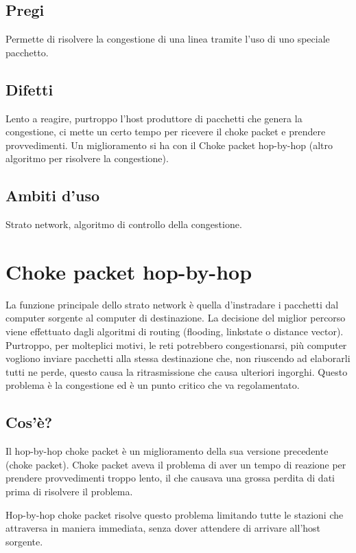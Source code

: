 \subsection{Pregi}
Permette di risolvere la congestione di una linea tramite l'uso di uno speciale pacchetto.

\subsection{Difetti}
Lento a reagire, purtroppo l'host produttore di pacchetti che genera la congestione, ci mette un certo tempo per ricevere il choke packet e prendere provvedimenti. Un miglioramento si ha con il Choke packet hop-by-hop (altro algoritmo per risolvere la congestione).

\subsection{Ambiti d'uso}
Strato network, algoritmo di controllo della congestione.

\section{Choke packet hop-by-hop}

La funzione principale dello strato network è quella d'instradare i pacchetti dal computer sorgente al computer di destinazione. La decisione del miglior percorso viene effettuato dagli algoritmi di routing (flooding, linkstate o distance vector). Purtroppo, per molteplici motivi, le reti potrebbero congestionarsi, più computer vogliono inviare pacchetti alla stessa destinazione che, non riuscendo ad elaborarli tutti ne perde, questo causa la ritrasmissione che causa ulteriori ingorghi. Questo problema è la congestione ed è un punto critico che va regolamentato.
\subsection{Cos'è?}
Il hop-by-hop choke packet è un miglioramento della sua versione precedente (choke packet).
Choke packet aveva il problema di aver un tempo di reazione per prendere provvedimenti troppo lento, il che causava una grossa perdita di dati prima di risolvere il problema.

Hop-by-hop choke packet risolve questo problema limitando tutte le stazioni che attraversa in maniera immediata, senza dover attendere di arrivare all'host sorgente.


